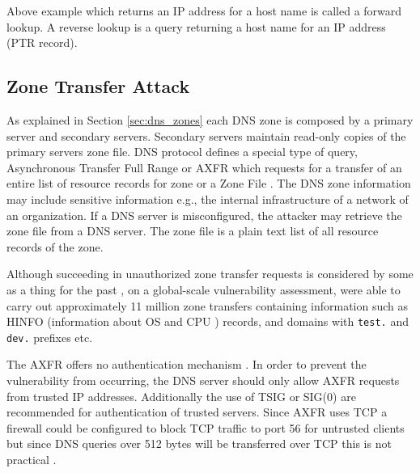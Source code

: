 Above example which returns an IP address for a host name is called a forward lookup. A reverse lookup is a query returning a host name for an IP address (PTR record).

\subsection{Zone Transfer Attack}

As explained in Section \ref{sec:dns_zones} each DNS zone is composed by a primary server and secondary servers. Secondary servers maintain read-only copies of the primary servers zone file. DNS protocol defines a special type of query, Asynchronous Transfer Full Range or AXFR which requests for a transfer of an entire list of resource records for zone or a Zone File \cite{RFC1034}. The DNS zone information may include sensitive information e.g., the internal infrastructure of a network of an organization. If a DNS server is misconfigured, the attacker may retrieve the zone file from a DNS server. The zone file is a plain text list of all resource records of the zone.

Although succeeding in unauthorized zone transfer requests is considered by some as a thing for the past \cite{network_sec_assessment}, on a global-scale vulnerability assessment,  \citet{global_zone_transfer} were able to carry out approximately 11 million zone transfers containing information such as HINFO (information about OS and CPU \cite{RFC1035}) records, and domains with \texttt{test.} and \texttt{dev.} prefixes etc.

The AXFR offers no authentication mechanism \cite{RFC1035}\cite{RFC5936}. In order to prevent the vulnerability from occurring, the DNS server should only allow AXFR requests from trusted IP addresses. Additionally the use of TSIG or SIG(0) are recommended for authentication of trusted servers\cite{RFC5936}. Since AXFR uses TCP \cite{RFC1034}\cite{RFC1035} a firewall could be configured to block TCP traffic to port 56 for untrusted clients but since DNS queries over 512 bytes will be transferred over TCP this is not practical \cite{hacking_exposed}.






